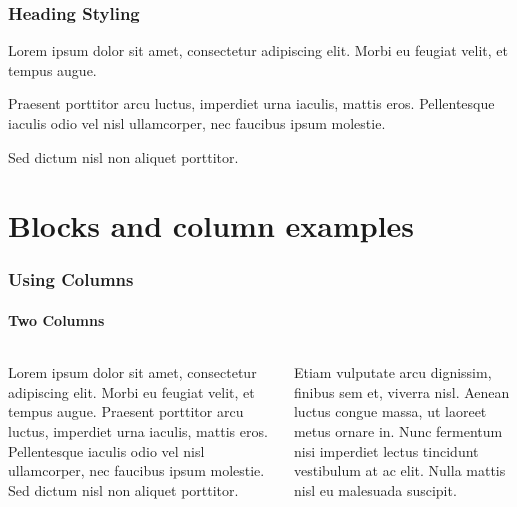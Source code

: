 \documentclass[
	aspectratio=169, %
	12pt, %
	t, %
]{beamer}
\begin{document}

\begin{frame}
	\frametitle{Heading Styling}


	Lorem ipsum dolor sit amet, consectetur adipiscing elit. Morbi eu feugiat velit, et tempus augue.
	

	Praesent porttitor arcu luctus, imperdiet urna iaculis, mattis eros. Pellentesque iaculis odio vel nisl ullamcorper, nec faucibus ipsum molestie.
	

	Sed dictum nisl non aliquet porttitor.
\end{frame}


\section{Blocks and column examples}


\begin{frame}
	\frametitle{Using Columns}
	\framesubtitle{Two Columns}

	\begin{columns}[T]
		\begin{column}{0.45\textwidth}
			Lorem ipsum dolor sit amet, consectetur adipiscing elit. Morbi eu feugiat velit, et tempus augue. Praesent porttitor arcu luctus, imperdiet urna iaculis, mattis eros. Pellentesque iaculis odio vel nisl ullamcorper, nec faucibus ipsum molestie. Sed dictum nisl non aliquet porttitor.
		\end{column}
		
		\hfill

		\begin{column}{0.45\textwidth}
			Etiam vulputate arcu dignissim, finibus sem et, viverra nisl. Aenean luctus congue massa, ut laoreet metus ornare in. Nunc fermentum nisi imperdiet lectus tincidunt vestibulum at ac elit. Nulla mattis nisl eu malesuada suscipit.
		\end{column}
	\end{columns}
\end{frame}
\end{document}
